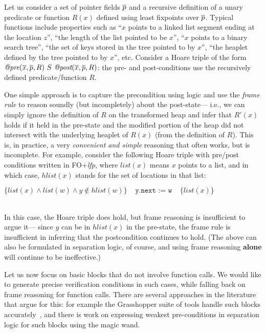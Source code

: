 Let us consider a set of pointer fields $\overline{p}$ and a recursive definition of a unary predicate or function $R(x)$ defined
using least fixpoints over $\overline{p}$. Typical functions include properties such as 
``$x$ points to a linked list segment ending at the location $z$'', ``the length of the list pointed to be $x$'', 
``$x$ points to a binary search tree'', ``the set of keys stored in the tree pointed to by $x$'', ``the heaplet defined
by the tree pointed to by $x$'', etc.
Consider a Hoare triple of the form $\textit{@pre}(\overline{x}, \overline{p}, R) ~S~ \textit{@post}(\overline{x}, \overline{p}, R)$: the pre- and post-conditions use the recursively defined predicate/function $R$.

One simple approach is to capture the precondition using logic and use the \emph{frame rule} to reason soundly
(but incompletely) about the post-state--- i.e., we can simply ignore the definition of $R$
on the transformed heap and infer that $R'(x)$ holds if it held in the pre-state and 
the modified portion of the heap did not intersect with the underlying heaplet of $R(x)$ (from the definition of $R$).
This is, in practice, a very \emph{convenient and simple} reasoning that often works, but is incomplete.
For example, consider the following Hoare triple with pre/post conditions written in FO+\textit{lfp},
where $list(x)$ means $x$ points to a list, and in which
case, $hlist(x)$ stands for the set of locations in that list: \\
\centerline{$ \{ list(x) \wedge  list(w) \wedge  y \not \in hlist(w) \} 
~~~~~\texttt{y.next := w}~~~~~
\{list(x) \}$}\\
\noindent In this case, the Hoare triple does hold, but frame reasoning is insufficient to argue it--- since $y$ can be
in $hlist(x)$ in the pre-state, the frame rule is insufficient in inferring that the postcondition continues to hold. 
(The above can also be formulated in separation logic, of course, and using frame reasoning \textbf{alone} will continue to be
ineffective.)

Let us now focus on basic blocks that do not involve function calls. We would like
to generate precise verification conditions in such cases, while falling back on frame reasoning for function calls. 
There are several approaches in the literature that argue for this: for example the Grasshopper suite of tools
handle such blocks accurately~\cite{PiskacWiesZufferey2014}, and there is work on
expressing weakest pre-conditions in separation logic for such blocks 
using the magic wand.

